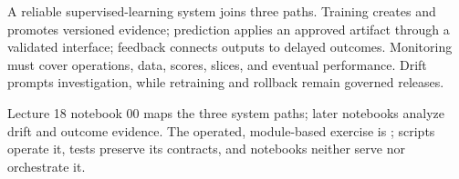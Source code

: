 \begin{chapterreview}
A reliable supervised-learning system joins three paths. Training creates and
promotes versioned evidence; prediction applies an approved artifact through a
validated interface; feedback connects outputs to delayed outcomes. Monitoring
must cover operations, data, scores, slices, and eventual performance. Drift
prompts investigation, while retraining and rollback remain governed releases.
\end{chapterreview}

\begin{notebooklink}
Lecture 18 notebook 00 maps the three system paths; later notebooks analyze
drift and outcome evidence. The operated, module-based exercise is
; scripts operate it, tests preserve
its contracts, and notebooks neither serve nor orchestrate it.
\end{notebooklink}
